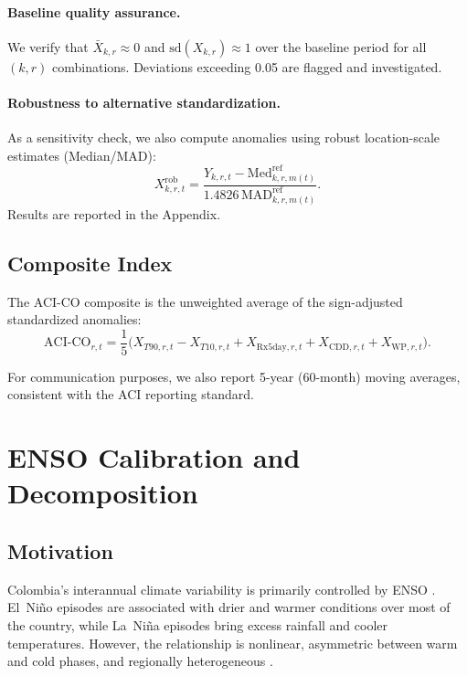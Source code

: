 \documentclass[12pt]{article}
\begin{document}
\paragraph{Baseline quality assurance.} We verify that $\bar{X}_{k,r} \approx 0$ and $\mathrm{sd}(X_{k,r}) \approx 1$ over the baseline period for all $(k,r)$ combinations. Deviations exceeding 0.05 are flagged and investigated.

\paragraph{Robustness to alternative standardization.} As a sensitivity check, we also compute anomalies using robust location-scale estimates (Median/MAD):
\begin{equation}\label{eq:robust_z}
X^{\mathrm{rob}}_{k,r,t} = \frac{Y_{k,r,t} - \mathrm{Med}^{\mathrm{ref}}_{k,r,m(t)}}{1.4826\,\mathrm{MAD}^{\mathrm{ref}}_{k,r,m(t)}}.
\end{equation}
Results are reported in the Appendix.

\subsection{Composite Index}\label{sec:composite}

The ACI-CO composite is the unweighted average of the sign-adjusted standardized anomalies:
\begin{equation}\label{eq:aci_composite}
\mathrm{ACI\text{-}CO}_{r,t} = \frac{1}{5}\Big(X_{T90,r,t} - X_{T10,r,t} + X_{\mathrm{Rx5day},r,t} + X_{\mathrm{CDD},r,t} + X_{\mathrm{WP},r,t}\Big).
\end{equation}

For communication purposes, we also report 5-year (60-month) moving averages, consistent with the ACI reporting standard.

\section{ENSO Calibration and Decomposition}\label{sec:enso}

\subsection{Motivation}

Colombia's interannual climate variability is primarily controlled by ENSO \citep{poveda2011}. El~Ni\~no episodes are associated with drier and warmer conditions over most of the country, while La~Ni\~na episodes bring excess rainfall and cooler temperatures. However, the relationship is nonlinear, asymmetric between warm and cold phases, and regionally heterogeneous \citep{morales2021wavelet,hurtado2021chirps}.
\end{document}

